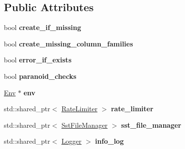 \subsection*{Public Attributes}
\begin{DoxyCompactItemize}
\item 
bool {\bfseries create\+\_\+if\+\_\+missing}\hypertarget{structrocksdb_1_1DBOptions_abdcf05ab83219edf0d03d8d02d39ee0c}{}\label{structrocksdb_1_1DBOptions_abdcf05ab83219edf0d03d8d02d39ee0c}

\item 
bool {\bfseries create\+\_\+missing\+\_\+column\+\_\+families}\hypertarget{structrocksdb_1_1DBOptions_a4d8d13c5e43ca4a5b2a54f08aa3b7f60}{}\label{structrocksdb_1_1DBOptions_a4d8d13c5e43ca4a5b2a54f08aa3b7f60}

\item 
bool {\bfseries error\+\_\+if\+\_\+exists}\hypertarget{structrocksdb_1_1DBOptions_a4487e7de36b93dc5a06d6daf21bac151}{}\label{structrocksdb_1_1DBOptions_a4487e7de36b93dc5a06d6daf21bac151}

\item 
bool {\bfseries paranoid\+\_\+checks}\hypertarget{structrocksdb_1_1DBOptions_a0797bb6a87fc0345f24330ad531977c7}{}\label{structrocksdb_1_1DBOptions_a0797bb6a87fc0345f24330ad531977c7}

\item 
\hyperlink{classrocksdb_1_1Env}{Env} $\ast$ {\bfseries env}\hypertarget{structrocksdb_1_1DBOptions_a5c6e3419dd7cad2e73f746a5a5975ff9}{}\label{structrocksdb_1_1DBOptions_a5c6e3419dd7cad2e73f746a5a5975ff9}

\item 
std\+::shared\+\_\+ptr$<$ \hyperlink{classrocksdb_1_1RateLimiter}{Rate\+Limiter} $>$ {\bfseries rate\+\_\+limiter}\hypertarget{structrocksdb_1_1DBOptions_aede14b809742935900cd5a8b544ad7b3}{}\label{structrocksdb_1_1DBOptions_aede14b809742935900cd5a8b544ad7b3}

\item 
std\+::shared\+\_\+ptr$<$ \hyperlink{classrocksdb_1_1SstFileManager}{Sst\+File\+Manager} $>$ {\bfseries sst\+\_\+file\+\_\+manager}\hypertarget{structrocksdb_1_1DBOptions_a138d954e6c0b69672c7a9eaf7ad11d3f}{}\label{structrocksdb_1_1DBOptions_a138d954e6c0b69672c7a9eaf7ad11d3f}

\item 
std\+::shared\+\_\+ptr$<$ \hyperlink{classrocksdb_1_1Logger}{Logger} $>$ {\bfseries info\+\_\+log}\hypertarget{structrocksdb_1_1DBOptions_ac7eb66ab129bde4525879c737435c98e}{}\label{structrocksdb_1_1DBOptions_ac7eb66ab129bde4525879c737435c98e}


\end{DoxyCompactItemize}
